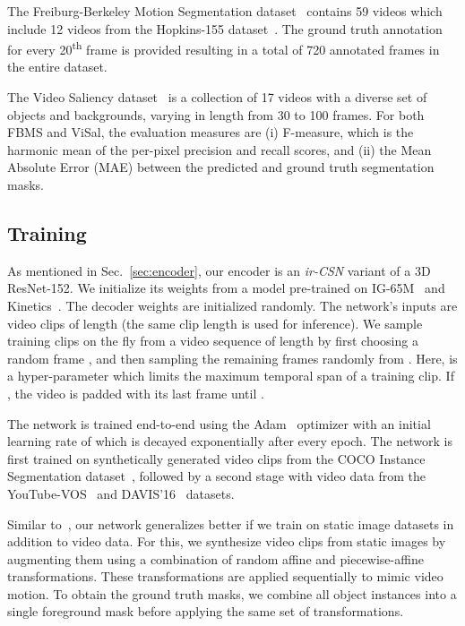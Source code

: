 \documentclass{bmvc2k}
\newcommand{\PAR}[1]{\vskip4pt \noindent {\bf #1~}}
\begin{document}
\PAR{FBMS.} The Freiburg-Berkeley Motion Segmentation dataset~\cite{Ochs13TPAMI} contains 59 videos which include 12 videos from the Hopkins-155 dataset~\cite{Tron07CVPR}. 
The ground truth annotation for every 20\textsuperscript{th} frame is provided resulting in a total of 720 annotated frames in the entire dataset.

\PAR{ViSal.} The Video Saliency dataset~\cite{Wang15TIP} is a collection of 17 videos with a diverse set of objects and backgrounds, varying in length from 30 to 100 frames.
For both FBMS and ViSal, the evaluation measures are (i) F-measure, which is the harmonic mean of the per-pixel precision and recall scores, and (ii) the Mean Absolute Error (MAE)  between the predicted and ground truth segmentation masks.

\subsection{Training}
\label{sec:training}

As mentioned in Sec.~\ref{sec:encoder}, our encoder is an \textit{ir-CSN} variant of a 3D ResNet-152. We initialize its weights from a model pre-trained on IG-65M~\cite{Ghadiyaram19CVPR} and Kinetics~\cite{Kay17ARXIV}. The decoder weights are initialized randomly. 
The network's inputs are video clips of length  (the same clip length is used for inference). We sample training clips on the fly from a video sequence of length  by first choosing a random frame , and then sampling the remaining  frames randomly from .
Here,  is a hyper-parameter which limits the maximum temporal span of a training clip. If , the video is padded with its last frame until . 

The network is trained end-to-end using the Adam~\cite{Kingma15ICLR} optimizer with an initial learning rate of  which is decayed exponentially after every epoch. The network is first trained on synthetically generated video clips from the COCO Instance Segmentation dataset~\cite{Lin14ECCV}, followed by a second stage with video data from the YouTube-VOS~\cite{Xu18ECCV} and DAVIS'16~\cite{Perazzi16CVPR} datasets. 

\PAR{Pre-training on Images:} Similar to~\cite{athar20arxiv,Wug18CVPR,Wang18TIP}, our network generalizes better if we train on static image datasets in addition to video data. For this, we synthesize video clips from static images by augmenting them using a combination of random affine and piecewise-affine transformations. These transformations are applied sequentially to mimic video motion.
To obtain the ground truth masks, we combine all object instances into a single foreground mask before applying the same set of transformations.
    
\end{document}
